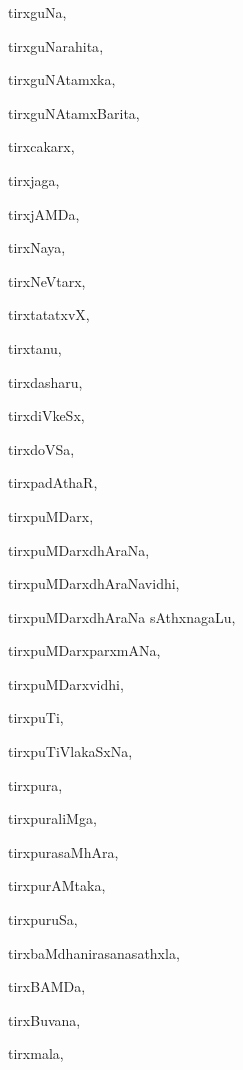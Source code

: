 \begin{multicols}{2}
{tirxguNa}, \pageref{tirxguNa}

{tirxguNarahita}, \pageref{tirxguNarahita}

{tirxguNAtamxka}, \pageref{tirxguNAtamxka}

{tirxguNAtamxBarita}, \pageref{tirxguNAtamxBarita}

{tirxcakarx}, \pageref{tirxcakarx}

{tirxjaga}, \pageref{tirxjaga}

{tirxjAMDa}, \pageref{tirxjAMDa}

{tirxNaya}, \pageref{tirxNaya}

{tirxNeVtarx}, \pageref{tirxNeVtarx}

{tirxtatatxvX}, \pageref{tirxtatatxvX}

{tirxtanu}, \pageref{tirxtanu}

{tirxdasharu}, \pageref{tirxdasharu}

{tirxdiVkeSx}, \pageref{tirxdiVkeSx}

{tirxdoVSa}, \pageref{tirxdoVSa}

{tirxpadAthaR}, \pageref{tirxpadAthaR}

{tirxpuMDarx}, \pageref{tirxpuMDarx}

{tirxpuMDarxdhAraNa}, \pageref{tirxpuMDarxdhAraNa}

{tirxpuMDarxdhAraNavidhi}, \pageref{tirxpuMDarxdhAraNavidhi}

{tirxpuMDarxdhAraNa sAthxna\-gaLu}, \pageref{tirxpuMDarxdhAraNa sAthxnagaLu}

{tirxpuMDarxparxmANa}, \pageref{tirxpuMDarxparxmANa}

{tirxpuMDarxvidhi}, \pageref{tirxpuMDarxvidhi}

{tirxpuTi}, \pageref{tirxpuTi}

{tirxpuTiVlakaSxNa}, \pageref{tirxpuTiVlakaSxNa}

{tirxpura}, \pageref{tirxpura}

{tirxpuraliMga}, \pageref{tirxpuraliMga}

{tirxpurasaMhAra}, \pageref{tirxpurasaMhAra}

{tirxpurAMtaka}, \pageref{tirxpurAMtaka}

{tirxpuruSa}, \pageref{tirxpuruSa}

{tirxbaMdhanirasanasathxla}, \pageref{tirxbaMdhanirasanasathxla}

{tirxBAMDa}, \pageref{tirxBAMDa}

{tirxBuvana}, \pageref{tirxBuvana}

{tirxmala}, \pageref{tirxmala}


\end{multicols}
